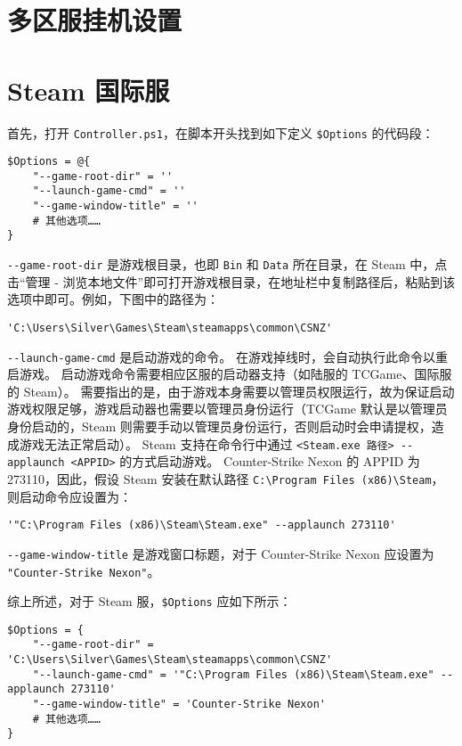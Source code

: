 \section{多区服挂机设置}

\section{Steam 国际服}

首先，打开 \lstinline{Controller.ps1}，在脚本开头找到如下定义 \verb|$Options| 的代码段：

\begin{verbatim}
$Options = @{
	"--game-root-dir" = ''
	"--launch-game-cmd" = ''
	"--game-window-title" = ''
	# 其他选项……
}
\end{verbatim}

\verb|--game-root-dir| 是游戏根目录，也即 \verb|Bin| 和 \verb|Data| 所在目录，在 Steam 中，点击“管理 - 浏览本地文件”即可打开游戏根目录，在地址栏中复制路径后，粘贴到该选项中即可。例如，下图中的路径为：

\begin{verbatim}
'C:\Users\Silver\Games\Steam\steamapps\common\CSNZ'
\end{verbatim}

\verb|--launch-game-cmd| 是启动游戏的命令。
在游戏掉线时，会自动执行此命令以重启游戏。
启动游戏命令需要相应区服的启动器支持（如陆服的 TCGame、国际服的 Steam）。
需要指出的是，由于游戏本身需要以管理员权限运行，故为保证启动游戏权限足够，游戏启动器也需要以管理员身份运行（TCGame 默认是以管理员身份启动的，Steam 则需要手动以管理员身份运行，否则启动时会申请提权，造成游戏无法正常启动）。
Steam 支持在命令行中通过 \verb|<Steam.exe 路径> --applaunch <APPID>| 的方式启动游戏。
Counter-Strike Nexon 的 APPID 为 273110，因此，假设 Steam 安装在默认路径 \verb|C:\Program Files (x86)\Steam|，则启动命令应设置为：

\begin{verbatim}
'"C:\Program Files (x86)\Steam\Steam.exe" --applaunch 273110'
\end{verbatim}

\verb|--game-window-title| 是游戏窗口标题，对于 Counter-Strike Nexon 应设置为 \verb|"Counter-Strike Nexon"|。

综上所述，对于 Steam 服，\verb|$Options| 应如下所示：

\begin{verbatim}
$Options = {
	"--game-root-dir" = 'C:\Users\Silver\Games\Steam\steamapps\common\CSNZ'
	"--launch-game-cmd" = '"C:\Program Files (x86)\Steam\Steam.exe" --applaunch 273110'
	"--game-window-title" = 'Counter-Strike Nexon'
	# 其他选项……
}
\end{verbatim}